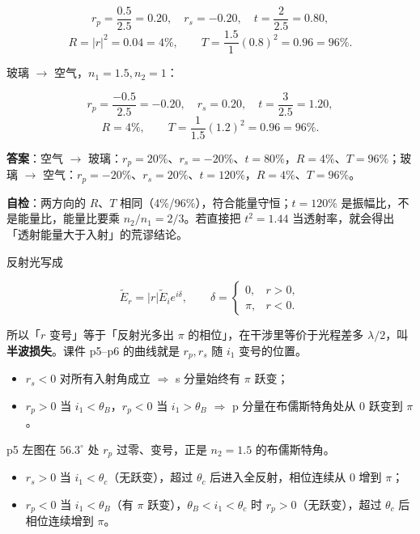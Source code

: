 \documentclass[11pt]{ctexart}
\begin{document}
\[
r_p=\frac{0.5}{2.5}=0.20,\quad r_s=-0.20,\quad t=\frac{2}{2.5}=0.80,
\]
\[
R=|r|^2=0.04=4\%,\qquad T=\frac{1.5}{1}(0.8)^2=0.96=96\%.
\]

玻璃 $\to$ 空气，$n_1=1.5,n_2=1$：

\[
r_p=\frac{-0.5}{2.5}=-0.20,\quad r_s=0.20,\quad t=\frac{3}{2.5}=1.20,
\]
\[
R=4\%,\qquad T=\frac{1}{1.5}(1.2)^2=0.96=96\%.
\]

\textbf{答案}：空气 $\to$ 玻璃：$r_p=20\%$、$r_s=-20\%$、$t=80\%$，$R=4\%$、$T=96\%$；玻璃 $\to$ 空气：$r_p=-20\%$、$r_s=20\%$、$t=120\%$，$R=4\%$、$T=96\%$。

\textbf{自检}：两方向的 $R$、$T$ 相同（4\%/96\%），符合能量守恒；$t=120\%$ 是振幅比，不是能量比，能量比要乘 $n_2/n_1=2/3$。若直接把 $t^2=1.44$ 当透射率，就会得出「透射能量大于入射」的荒谬结论。



反射光写成

\[
\tilde E_r=|r|\tilde E_i e^{i\delta},\qquad
\delta=\begin{cases}0,&r>0,\\ \pi,&r<0.\end{cases}
\]

所以「$r$ 变号」等于「反射光多出 $\pi$ 的相位」，在干涉里等价于光程差多 $\lambda/2$，叫\textbf{半波损失}。课件 p5--p6 的曲线就是 $r_p,r_s$ 随 $i_1$ 变号的位置。


\begin{itemize}
\item $r_s<0$ 对所有入射角成立 $\Rightarrow$ s 分量始终有 $\pi$ 跃变；
\item $r_p>0$ 当 $i_1<\theta_B$，$r_p<0$ 当 $i_1>\theta_B$ $\Rightarrow$ p 分量在布儒斯特角处从 $0$ 跃变到 $\pi$。
\end{itemize}

p5 左图在 $56.3^\circ$ 处 $r_p$ 过零、变号，正是 $n_2=1.5$ 的布儒斯特角。


\begin{itemize}
\item $r_s>0$ 当 $i_1<\theta_c$（无跃变），超过 $\theta_c$ 后进入全反射，相位连续从 $0$ 增到 $\pi$；
\item $r_p<0$ 当 $i_1<\theta_B$（有 $\pi$ 跃变），$\theta_B<i_1<\theta_c$ 时 $r_p>0$（无跃变），超过 $\theta_c$ 后相位连续增到 $\pi$。
\end{itemize}
\end{document}
